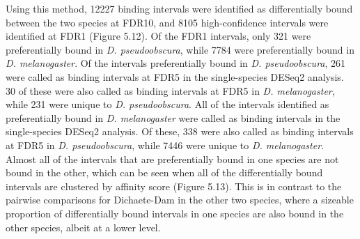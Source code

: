 Using this method, 12227 binding intervals were identified as differentially bound between the two species at FDR10, and 8105 high-confidence intervals were identified at FDR1 (Figure 5.12). Of the FDR1 intervals, only 321 were preferentially bound in \emph{D. pseudoobscura}, while 7784 were preferentially bound in \emph{D. melanogaster}. Of the intervals preferentially bound in \emph{D. pseudoobscura}, 261 were called as binding intervals at FDR5 in the single-species DESeq2 analysis. 30 of these were also called as binding intervals at FDR5 in \emph{D. melanogaster}, while 231 were unique to \emph{D. pseudoobscura}. All of the intervals identified as preferentially bound in \emph{D. melanogaster} were called as binding intervals in the single-species DESeq2 analysis. Of these, 338 were also called as binding intervals at FDR5 in \emph{D. pseudoobscura}, while 7446 were unique to \emph{D. melanogaster}. Almost all of the intervals that are preferentially bound in one species are not bound in the other, which can be seen when all of the differentially bound intervals are clustered by affinity score (Figure 5.13). This is in contrast to the pairwise comparisons for Dichaete-Dam in the other two species, where a sizeable proportion of differentially bound intervals in one species are also bound in the other species, albeit at a lower level.

